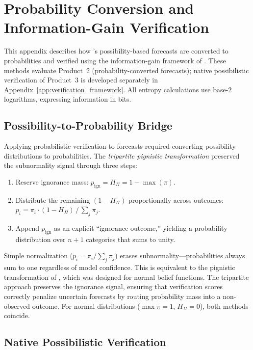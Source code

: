 \section{Probability Conversion and Information-Gain Verification}\label{app:information_theory}

This appendix describes how \clyfar{}'s possibility-based forecasts are converted to probabilities and verified using the information-gain framework of \citet{Lawson2024-bu}. These methods evaluate Product~2 (probability-converted forecasts); native possibilistic verification of Product~3 is developed separately in Appendix~\ref{app:verification_framework}. All entropy calculations use base-2 logarithms, expressing information in bits.

\subsection{Possibility-to-Probability Bridge}\label{sec:poss_prob_bridge}

Applying probabilistic verification to \clyfar{} forecasts required converting possibility distributions to probabilities. The \textit{tripartite pignistic transformation} preserved the subnormality signal through three steps:
\begin{enumerate}[leftmargin=2em]
\item Reserve ignorance mass: $p_{\text{ign}} = H_\Pi = 1 - \max(\pi)$.
\item Distribute the remaining $(1 - H_\Pi)$ proportionally across outcomes: $p_i = \pi_i \cdot (1 - H_\Pi) \,/\, \sum_j \pi_j$.
\item Append $p_{\text{ign}}$ as an explicit ``ignorance outcome,'' yielding a probability distribution over $n+1$ categories that sums to unity.
\end{enumerate}

Simple normalization ($p_i = \pi_i / \sum_j \pi_j$) erases subnormality---probabilities always sum to one regardless of model confidence. This is equivalent to the pignistic transformation of \citet{Smets1990-MISSING}, which was designed for normal belief functions. The tripartite approach preserves the ignorance signal, ensuring that verification scores correctly penalize uncertain forecasts by routing probability mass into a non-observed outcome. For normal distributions ($\max \pi = 1$, $H_\Pi = 0$), both methods coincide.

\subsection{Native Possibilistic Verification}\label{sec:poss_verification}

